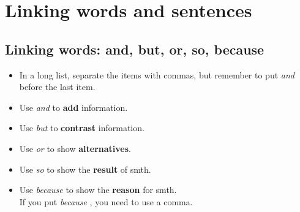 \section{Linking words and sentences}

\subsection{Linking words: and, but, or, so, because}
\begin{itemize}
    \item In a long list, separate the items with commas, but remember to put \textit{and} before the last item.
    \item Use \textit{and} to \textbf{add} information.
    \item Use \textit{but} to \textbf{contrast} information.
    \item Use \textit{or} to show \textbf{alternatives}.
    \item Use \textit{so} to show the \textbf{result} of smth.
    \item Use \textit{because} to show the \textbf{reason} for smth.\\
    If you put \textit{because} , you need to use a comma.
\end{itemize}

